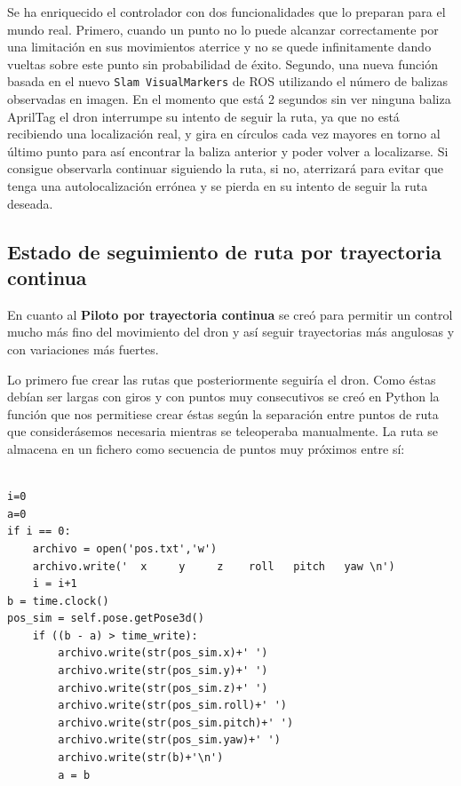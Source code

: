 \hspace{1cm} Se ha enriquecido el controlador con dos funcionalidades que lo preparan para el mundo real. Primero, cuando un punto no lo puede alcanzar correctamente por una limitación en sus movimientos aterrice y no se quede infinitamente dando vueltas sobre este punto sin probabilidad de éxito. Segundo, una nueva función basada en el nuevo \texttt{Slam VisualMarkers} de ROS utilizando el número de balizas observadas en imagen. En el momento que está 2 segundos sin ver ninguna baliza AprilTag el dron interrumpe su intento de seguir la ruta, ya que no está recibiendo una localización real, y gira en círculos cada vez mayores en torno al último punto para así encontrar la baliza anterior y poder volver a localizarse. Si consigue observarla continuar siguiendo la ruta, si no, aterrizará para evitar que tenga una autolocalización errónea y se pierda en su intento de seguir la ruta deseada.
\\

\subsection{Estado de seguimiento de ruta por trayectoria continua}
\hspace{1cm} En cuanto al \textbf{Piloto por trayectoria continua} se creó para permitir un control mucho más fino del movimiento del dron y así seguir
trayectorias más angulosas y con variaciones más fuertes.

\hspace{1cm} Lo primero fue crear las rutas que posteriormente seguiría el dron. Como éstas debían ser largas con giros y con puntos muy consecutivos se creó en Python la función que nos permitiese crear éstas según la separación entre puntos de ruta que considerásemos necesaria mientras se teleoperaba manualmente. La ruta se almacena en un fichero como secuencia de puntos muy próximos entre sí: 
\\
\\
\begin{lstlisting}[backgroundcolor=\color{gray!15}]
i=0
a=0
if i == 0:
    archivo = open('pos.txt','w')
    archivo.write('  x     y     z    roll   pitch   yaw \n')
    i = i+1
b = time.clock()
pos_sim = self.pose.getPose3d()
    if ((b - a) > time_write):
        archivo.write(str(pos_sim.x)+' ')
        archivo.write(str(pos_sim.y)+' ')
        archivo.write(str(pos_sim.z)+' ')
        archivo.write(str(pos_sim.roll)+' ')
        archivo.write(str(pos_sim.pitch)+' ')
        archivo.write(str(pos_sim.yaw)+' ')
        archivo.write(str(b)+'\n')
        a = b 

\end{lstlisting}

